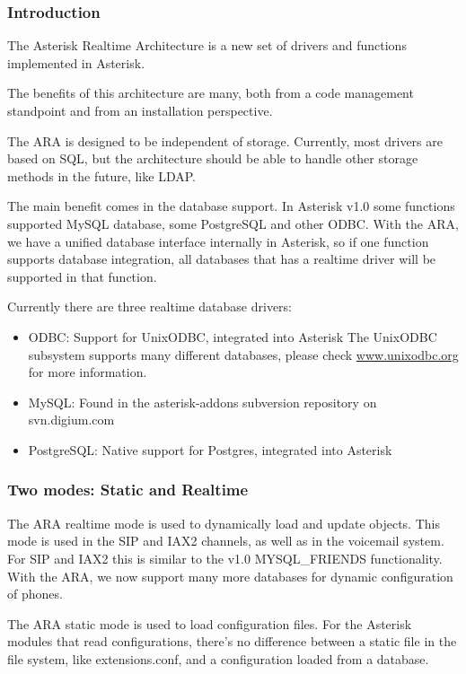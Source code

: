 \subsubsection{Introduction}

The Asterisk Realtime Architecture is a new set of drivers and 
functions implemented in Asterisk.

The benefits of this architecture are many, both from a code management
standpoint and from an installation perspective. 

The ARA is designed to be independent of storage. Currently, most
drivers are based on SQL, but the architecture should be able to handle
other storage methods in the future, like LDAP.

The main benefit comes in the database support. In Asterisk v1.0 some 
functions supported MySQL database, some PostgreSQL and other ODBC.
With the ARA, we have a unified database interface internally in Asterisk,
so if one function supports database integration, all databases that has a 
realtime driver will be supported in that function.

Currently there are three realtime database drivers:

\begin{itemize}
  \item ODBC: Support for UnixODBC, integrated into Asterisk
        The UnixODBC subsystem supports many different databases,
        please check \url{www.unixodbc.org} for more information.
  \item MySQL: Found in the asterisk-addons subversion repository on svn.digium.com
  \item PostgreSQL: Native support for Postgres, integrated into Asterisk
\end{itemize}

\subsubsection{Two modes: Static and Realtime}

The ARA realtime mode is used to dynamically load and update objects.
This mode is used in the SIP and IAX2 channels, as well as in the voicemail
system. For SIP and IAX2 this is similar to the v1.0 MYSQL\_FRIENDS 
functionality. With the ARA, we now support many more databases for
dynamic configuration of phones.

The ARA static mode is used to load configuration files. For the Asterisk
modules that read configurations, there's no difference between a static
file in the file system, like extensions.conf, and a configuration loaded
from a database.

